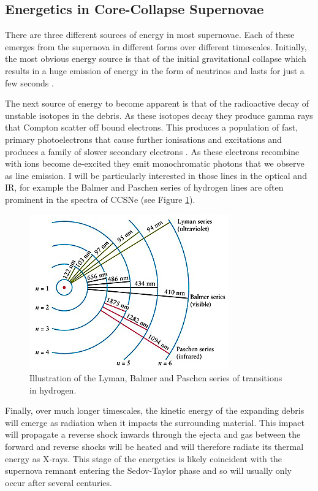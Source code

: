  
 \subsection{Energetics in Core-Collapse Supernovae}

There are three different sources of energy in most supernovae.  Each of these emerges from the supernova in different forms over different timescales.  Initially, the most obvious energy source is that of the initial gravitational collapse which results in a huge emission of energy in the form of neutrinos and lasts for just a few seconds \citep{Kotake2006}.  

The next source of energy to become apparent is that of the radioactive decay of unstable isotopes in the debris.  As these isotopes decay they produce gamma rays that Compton scatter off bound electrons.  This produces a population of fast, primary photoelectrons that cause further ionisations and excitations and produces a family of slower secondary electrons \citep{Fransson1986}.  As these electrons recombine with ions  become de-excited they emit monochromatic photons that we observe as line emission.  I will be particularly interested in those lines in the optical and IR, for example the Balmer and Paschen series of hydrogen lines are often prominent in the spectra of CCSNe (see Figure \ref{fig:balmer}).

 \begin{figure}
\centering
\includegraphics[clip=true,scale=0.9,trim= 0 0 0 0]{chapters/chapter1/figs/balmer1.jpg}
\caption{Illustration of the Lyman, Balmer and Paschen series of transitions in hydrogen.}
\label{fig:balmer}
\end{figure}


Finally, over much longer timescales, the kinetic energy of the expanding debris will emerge as radiation when it impacts the surrounding material.  This impact will propagate a reverse shock inwards through the ejecta and gas between the forward and reverse shocks will be heated and will therefore radiate its thermal energy as X-rays.  This stage of the energetics is likely coincident with the supernova remnant entering the Sedov-Taylor phase and so will usually only occur after several centuries.  

